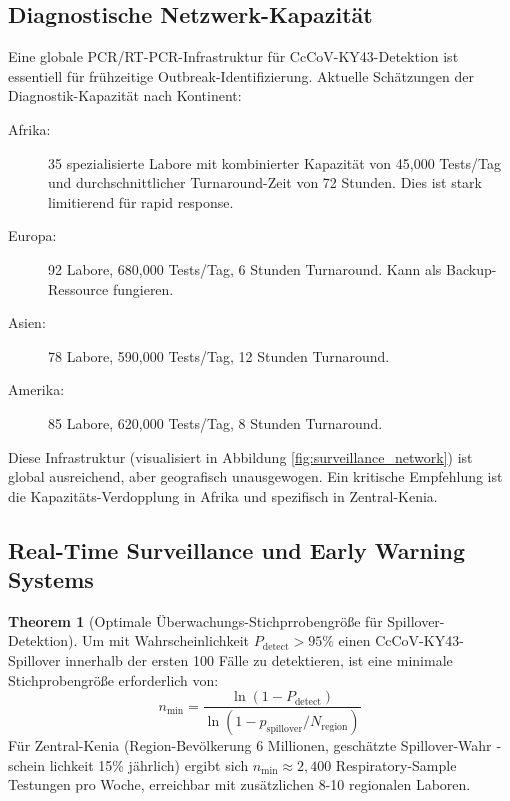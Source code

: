 ﻿\documentclass[11pt,a4paper]{article}
\theoremstyle{definition}
\newtheorem{theorem}{Theorem}[section]
\begin{document}
\subsection{Diagnostische Netzwerk-Kapazität}

Eine globale PCR/RT-PCR-Infrastruktur für CcCoV-KY43-Detektion ist essentiell für frühzeitige Outbreak-Identifizierung. Aktuelle Schätzungen der Diagnostik-Kapazität nach Kontinent:

\begin{description}
\item[Afrika:] 35 spezialisierte Labore mit kombinierter Kapazität von 45,000 Tests/Tag und durchschnittlicher Turnaround-Zeit von 72 Stunden. Dies ist stark limitierend für rapid response.

\item[Europa:] 92 Labore, 680,000 Tests/Tag, 6 Stunden Turnaround. Kann als Backup-Ressource fungieren.

\item[Asien:] 78 Labore, 590,000 Tests/Tag, 12 Stunden Turnaround.

\item[Amerika:] 85 Labore, 620,000 Tests/Tag, 8 Stunden Turnaround.
\end{description}

Diese Infrastruktur (visualisiert in Abbildung \ref{fig:surveillance_network}) ist global ausreichend, aber geografisch unausgewogen. Ein kritische Empfehlung ist die Kapazitäts-Verdopplung in Afrika und spezifisch in Zentral-Kenia.

\subsection{Real-Time Surveillance und Early Warning Systems}

\begin{theorem}[Optimale Überwachungs-Stichprrobengröße für Spillover-Detektion]
\label{thm:surveillance_sampling}
Um mit Wahrscheinlichkeit $P_{\text{detect}} > 95\%$ einen CcCoV-KY43-Spillover innerhalb der ersten 100 Fälle zu detektieren, ist eine minimale Stichprobengröße erforderlich von:
\[
n_{\text{min}} = \frac{\ln(1 - P_{\text{detect}})}{\ln(1 - p_{\text{spillover}}/N_{\text{region}})}
\]
Für Zentral-Kenia (Region-Bevölkerung 6 Millionen, geschätzte Spillover-Wahr ­schein ­lichkeit 15\% jährlich) ergibt sich $n_{\text{min}} \approx 2,400$ Respiratory-Sample Testungen pro Woche, erreichbar mit zusätzlichen 8-10 regionalen Laboren.
\end{theorem}
\end{document}
